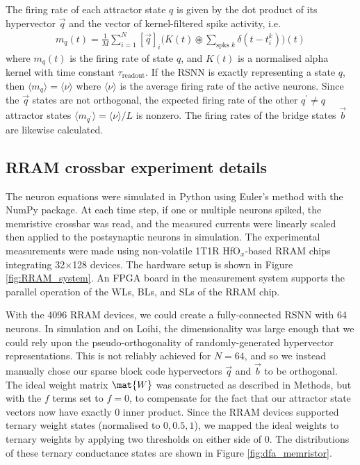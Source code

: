 The firing rate of each attractor state $q$ is given by the dot product of its hypervector $\vec{q}$ and the vector of kernel-filtered spike activity, i.e.
\begin{equation}
\begin{split}
m_q (t) = \frac{1}{M} \sum_{i=1}^N [\vec{q}]_i \big( K(t) \circledast \sum_{\text{spks } k} \delta(t - t_i^k) \big)(t)
\end{split}
\end{equation}
where $m_q(t)$ is the firing rate of state $q$, and $K(t)$ is a normalised alpha kernel with time constant $\tau_\text{readout}$. If the RSNN is exactly representing a state $q$, then $\langle m_q \rangle = \langle \nu \rangle$ where $\langle \nu \rangle$ is the average firing rate of the active neurons. Since the $\vec{q}$ states are not orthogonal, the expected firing rate of the other $q^\prime \neq q$ attractor states $\langle m_{q^\prime} \rangle = \langle \nu \rangle  / L$ is nonzero. The firing rates of the bridge states $\vec{b}$ are likewise calculated.



\subsection{RRAM crossbar experiment details}

The neuron equations were simulated in Python using Euler's method with the NumPy package. At each time step, if one or multiple neurons spiked, the memristive crossbar was read, and the measured currents were linearly scaled then applied to the postsynaptic neurons in simulation.
The experimental measurements were made using non-volatile 1T1R HfO$_x$-based RRAM chips integrating 32$\times$128 devices. The hardware setup is shown in Figure \ref{fig:RRAM_system}.
An FPGA board in the measurement system supports the parallel operation of the WLs, BLs, and SLs of the RRAM chip.

With the 4096 RRAM devices, we could create a fully-connected RSNN with 64 neurons. In simulation and on Loihi, the dimensionality was large enough that we could rely upon the pseudo-orthogonality of randomly-generated hypervector representations. This is not reliably achieved for $N=64$, and so we instead manually chose our sparse block code hypervectors $\vec{q}$ and $\vec{b}$ to be orthogonal. The ideal weight matrix $\mat{W}$ was constructed as described in Methods, but with the $f$ terms set to $f=0$, to compensate for the fact that our attractor state vectors now have exactly 0 inner product. Since the RRAM devices supported ternary weight states (normalised to $0,0.5,1$), we mapped the ideal weights to ternary weights by applying two thresholds on either side of 0. The distributions of these ternary conductance states are shown in Figure \ref{fig:dfa_memristor}.

